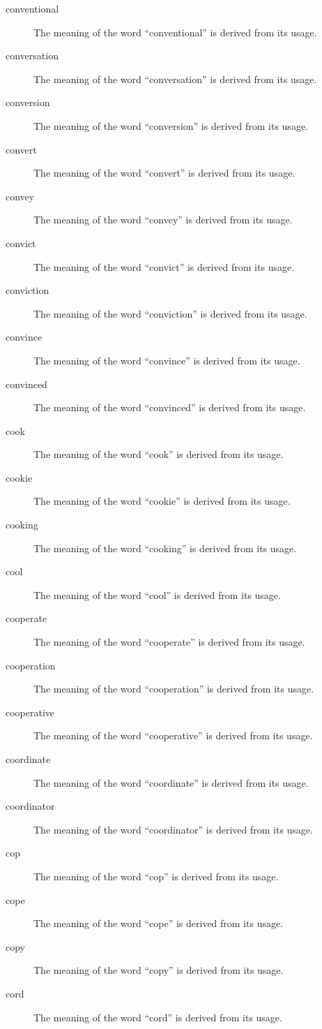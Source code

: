 \documentclass[12pt, letterpaper]{memoir}
\begin{document}
\begin{description}
\item[conventional] The meaning of the word ``conventional'' is derived from its usage.
\item[conversation] The meaning of the word ``conversation'' is derived from its usage.
\item[conversion] The meaning of the word ``conversion'' is derived from its usage.
\item[convert] The meaning of the word ``convert'' is derived from its usage.
\item[convey] The meaning of the word ``convey'' is derived from its usage.
\item[convict] The meaning of the word ``convict'' is derived from its usage.
\item[conviction] The meaning of the word ``conviction'' is derived from its usage.
\item[convince] The meaning of the word ``convince'' is derived from its usage.
\item[convinced] The meaning of the word ``convinced'' is derived from its usage.
\item[cook] The meaning of the word ``cook'' is derived from its usage.
\item[cookie] The meaning of the word ``cookie'' is derived from its usage.
\item[cooking] The meaning of the word ``cooking'' is derived from its usage.
\item[cool] The meaning of the word ``cool'' is derived from its usage.
\item[cooperate] The meaning of the word ``cooperate'' is derived from its usage.
\item[cooperation] The meaning of the word ``cooperation'' is derived from its usage.
\item[cooperative] The meaning of the word ``cooperative'' is derived from its usage.
\item[coordinate] The meaning of the word ``coordinate'' is derived from its usage.
\item[coordinator] The meaning of the word ``coordinator'' is derived from its usage.
\item[cop] The meaning of the word ``cop'' is derived from its usage.
\item[cope] The meaning of the word ``cope'' is derived from its usage.
\item[copy] The meaning of the word ``copy'' is derived from its usage.
\item[cord] The meaning of the word ``cord'' is derived from its usage.

\end{description}
\end{document}
